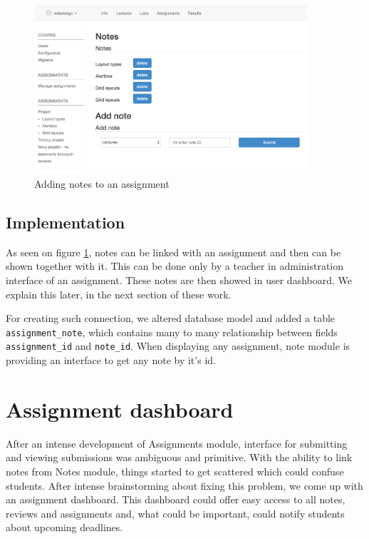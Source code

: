 \begin{figure}[h]
    \centering
    \includegraphics[width=0.9\textwidth]{images/notes.png}
    \caption{Adding notes to an assignment}
    \label{assignmentnote}
\end{figure}

\subsection{Implementation}
As seen on figure \ref{assignmentnote}, notes can be linked with an assignment and then can be shown together with it. This can be done only by a teacher in administration interface of an assignment. These notes are then showed in user dashboard. We explain this later, in the next section of these work.


For creating such connection, we altered database model and added a table \texttt{assignment\_note}, which contains many to many relationship between fields \texttt{assignment\_id} and \texttt{note\_id}. When displaying any assignment, note module is providing an interface to get any note by it's id.


\section{Assignment dashboard}

After an intense development of Assignments module, interface for submitting and viewing submissions was ambiguous and primitive. With the ability to link notes from Notes module, things started to get scattered which could confuse students. After intense brainstorming about fixing this problem, we come up with an assignment dashboard. This dashboard could offer easy access to all notes, reviews and assignments and, what could be important, could notify students about upcoming deadlines.

